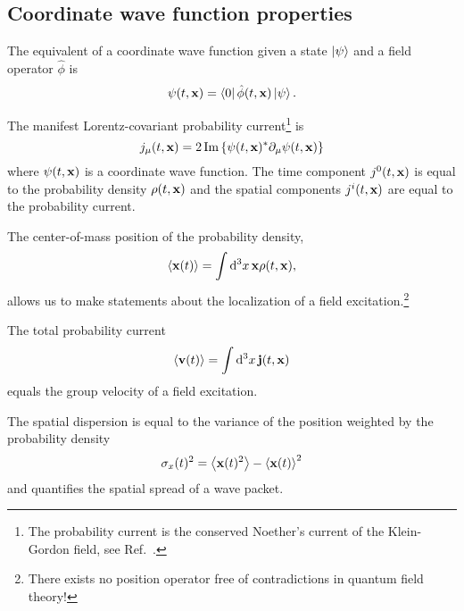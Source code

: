 \subsection{Coordinate wave function properties}

\begin{definition}
	The equivalent of a coordinate wave function given a state $\ket{\psi}$ and a field operator $\hat\phi$ is
	\begin{equation}
		\psi(t,\vb{x})
		=
		\bra{0}\hat\phi(t,\vb{x})\ket{\psi}
		.
	\end{equation}
\end{definition}
\begin{definition}
	The manifest Lorentz-covariant probability current\footnote{The probability current is the conserved Noether's current of the Klein-Gordon field, see Ref.~\cite[p.~18]{Peskin1995}.} is
	\begin{equation}
		j_\mu(t,\vb{x})
		=
		2
		\operatorname{\operatorname{Im}}\left\{
			\psi(t,\vb{x})^*
			\partial_\mu
			\psi(t,\vb{x})
		\right\}
		\label{eq:qkg_probability_current}
	\end{equation}
	where $\psi(t,\vb{x})$ is a coordinate wave function.
	The time component $j^0(t,\vb{x})$ is equal to the probability density $\rho(t,\vb{x})$ and the spatial components $j^i(t,\vb{x})$ are equal to the probability current.
\end{definition}
\begin{definition}[Localization]
	The center-of-mass position of the probability density,
	\begin{equation}
		\expval{\vb{x}(t)}
		=
		\int\dd[3]{x}
		\vb{x}
		\rho(t,\vb{x})
		,
	\end{equation}
	allows us to make statements about the localization of a field excitation.\footnote{There exists no position operator free of contradictions in quantum field theory!}
\end{definition}
\begin{definition}
	The total probability current
	\begin{equation}
		\expval{\vb{v}(t)}
		=
		\int\dd[3]{x}
		\vb{j}(t,\vb{x})
		\label{eq:group_velocity}
	\end{equation}
	equals the group velocity of a field excitation.
\end{definition}
\begin{definition}
	The spatial dispersion is equal to the variance of the position weighted by the probability density
	\begin{equation}
		\sigma_x(t)^2
		=
		\expval{\vb{x}(t)^2}
		-
		\expval{\vb{x}(t)}^2
	\end{equation}
	and quantifies the spatial spread of a wave packet.
\end{definition}